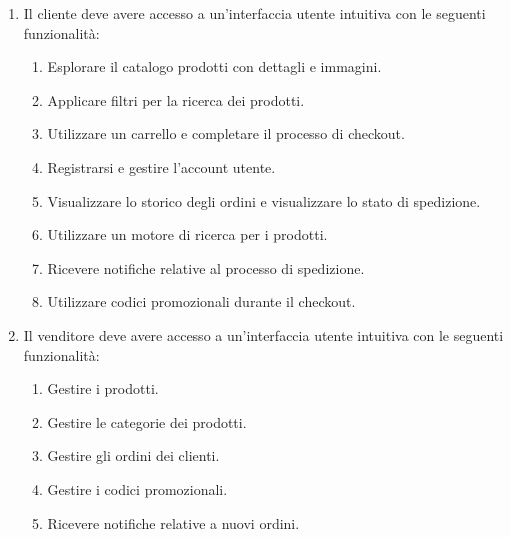 \begin{enumerate}
    \item Il cliente deve avere accesso a un'interfaccia utente intuitiva con le seguenti funzionalità:
          \begin{enumerate}
              \item Esplorare il catalogo prodotti con dettagli e immagini.
              \item Applicare filtri per la ricerca dei prodotti.
              \item Utilizzare un carrello e completare il processo di checkout.
              \item Registrarsi e gestire l'account utente.
              \item Visualizzare lo storico degli ordini e visualizzare lo stato di spedizione.
              \item Utilizzare un motore di ricerca per i prodotti.
              \item Ricevere notifiche relative al processo di spedizione.
              \item Utilizzare codici promozionali durante il checkout.
          \end{enumerate}
    \item Il venditore deve avere accesso a un'interfaccia utente intuitiva con le seguenti funzionalità:
          \begin{enumerate}
              \item Gestire i prodotti.
              \item Gestire le categorie dei prodotti.
              \item Gestire gli ordini dei clienti.
              \item Gestire i codici promozionali.
              \item Ricevere notifiche relative a nuovi ordini.
          \end{enumerate}
\end{enumerate}

